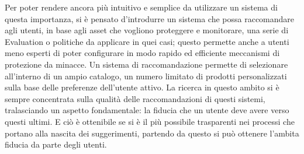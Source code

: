 \documentclass[10pt,a4paper]{article}
\begin{document}
Per poter rendere ancora più intuitivo e semplice da utilizzare un sistema di questa importanza, si è pensato d'introdurre un sistema 
che possa raccomandare agli utenti, in base agli asset che vogliono proteggere e monitorare, una serie di Evaluation o politiche da 
applicare in quei casi; questo permette anche a utenti meno esperti di poter configurare in modo rapido ed efficiente meccanismi di 
protezione da minacce. Un sistema di raccomandazione permette di selezionare all’interno di un ampio catalogo, un numero limitato di prodotti 
personalizzati sulla base delle preferenze dell’utente attivo. La ricerca in questo ambito si è sempre concentrata sulla qualità delle 
raccomandazioni di questi sistemi, tralasciando un aspetto fondamentale: la fiducia che un utente deve avere verso questi ultimi. 
E ciò è ottenibile se si è il più possibile trasparenti nei processi che portano alla nascita dei suggerimenti, partendo da questo 
si può ottenere l'ambita fiducia da parte degli utenti.
\end{document}

